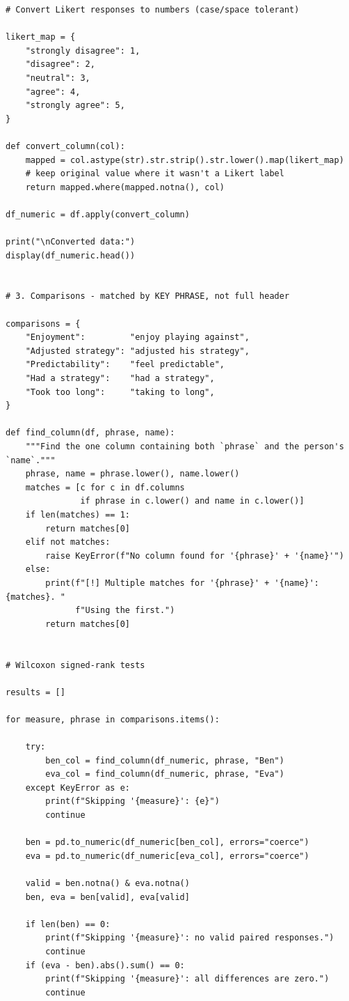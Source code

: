 \documentclass[12pt,a4paper,oneside]{report}
\begin{document}
\begin{appendices}
\begin{lstlisting}[style=python]
# Convert Likert responses to numbers (case/space tolerant)

likert_map = {
    "strongly disagree": 1,
    "disagree": 2,
    "neutral": 3,
    "agree": 4,
    "strongly agree": 5,
}

def convert_column(col):
    mapped = col.astype(str).str.strip().str.lower().map(likert_map)
    # keep original value where it wasn't a Likert label
    return mapped.where(mapped.notna(), col)

df_numeric = df.apply(convert_column)

print("\nConverted data:")
display(df_numeric.head())


# 3. Comparisons - matched by KEY PHRASE, not full header

comparisons = {
    "Enjoyment":         "enjoy playing against",
    "Adjusted strategy": "adjusted his strategy",
    "Predictability":    "feel predictable",
    "Had a strategy":    "had a strategy",
    "Took too long":     "taking to long",
}

def find_column(df, phrase, name):
    """Find the one column containing both `phrase` and the person's `name`."""
    phrase, name = phrase.lower(), name.lower()
    matches = [c for c in df.columns
               if phrase in c.lower() and name in c.lower()]
    if len(matches) == 1:
        return matches[0]
    elif not matches:
        raise KeyError(f"No column found for '{phrase}' + '{name}'")
    else:
        print(f"[!] Multiple matches for '{phrase}' + '{name}': {matches}. "
              f"Using the first.")
        return matches[0]


# Wilcoxon signed-rank tests

results = []

for measure, phrase in comparisons.items():

    try:
        ben_col = find_column(df_numeric, phrase, "Ben")
        eva_col = find_column(df_numeric, phrase, "Eva")
    except KeyError as e:
        print(f"Skipping '{measure}': {e}")
        continue

    ben = pd.to_numeric(df_numeric[ben_col], errors="coerce")
    eva = pd.to_numeric(df_numeric[eva_col], errors="coerce")

    valid = ben.notna() & eva.notna()
    ben, eva = ben[valid], eva[valid]

    if len(ben) == 0:
        print(f"Skipping '{measure}': no valid paired responses.")
        continue
    if (eva - ben).abs().sum() == 0:
        print(f"Skipping '{measure}': all differences are zero.")
        continue


\end{lstlisting}
\end{appendices}
\end{document}
